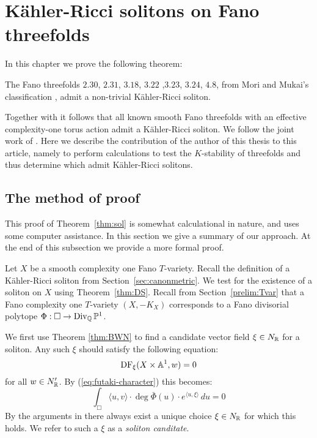 \chapter{K\"ahler-Ricci solitons on Fano threefolds} \label{chap:sol}



In this chapter we prove the following theorem:
\begin{theorem} \label{thm:sol}
The Fano threefolds \(2.30\), \(2.31\), \(3.18\), \(3.22\) ,\(3.23\), \(3.24\), \(4.8\), from Mori and Mukai's classification \cite{mori1981classification}, admit a non-trivial K\"ahler-Ricci soliton.
\end{theorem}
Together with \cite[Theorems. 6.1, 6.2]{ilten2015} it follows that all known smooth Fano threefolds with an effective complexity-one torus action admit a K\"ahler-Ricci soliton. We follow the joint work of \cite{cable2018classification}. Here we describe the contribution of the author of this thesis to this article, namely to perform calculations to test the \(K\)-stability of threefolds and thus determine which admit K\"ahler-Ricci solitons.

\section{The method of proof}
This proof of Theorem~\ref{thm:sol} is somewhat calculational in nature, and uses some computer assistance. In this section we give a summary of our approach. At the end of this subsection we provide a more formal proof.

Let \(X\) be a smooth complexity one Fano \(T\)-variety. Recall the definition of a K\"ahler-Ricci soliton from Section~\ref{sec:canonmetric}. We test for the existence of a soliton on \(X\) using Theorem~\ref{thm:DS}. Recall from Section~\ref{prelim:Tvar} that a Fano complexity one \(T\)-variety \((X,-K_X)\) corresponds to a Fano divisorial polytope \(\Phi: \Box \to \operatorname{Div}_{\mathbb{Q}} \mathbb{P}^1\).

We first use Theorem \ref{thm:BWN} to find a candidate vector field \(\xi \in N_{\mathbb{R}}\) for a soliton. Any such \(\xi\) should satisfy the following equation: 
\begin{equation} \label{eq:producteq}
\mathop{\rm DF}\nolimits_{\xi}(X \times \mathbb{A}^1, w) = 0
\end{equation}
for all \(w \in N'_{\mathbb{R}}\). By (\ref{eq:futaki-character}) this becomes:
\begin{equation} \label{eq:combproducteq}
\int_{\Box} \langle u, v \rangle \cdot \deg \bar \Phi(u) \cdot e^{\langle u, \xi \rangle}\, du = 0
\end{equation}
By the arguments in \cite[Section~3.1]{donaldson2008kahler} there always exist a unique choice $\xi \in N_{\mathbb{R}}$ for which this holds. We refer to such a $\xi$ as a \textit{soliton canditate}.

